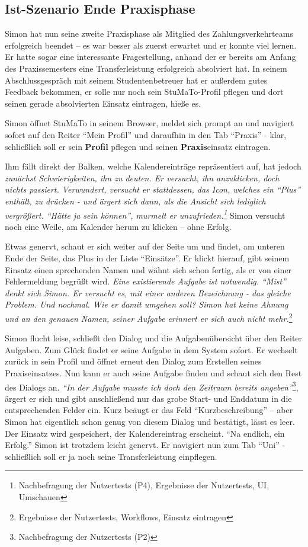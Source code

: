 \documentclass[
  12pt,
  ngerman,
  a4paper,
]{article}
\begin{document}
\hypertarget{ist-szenario-ende-praxisphase}{%
\subsection{Ist-Szenario Ende
Praxisphase}\label{ist-szenario-ende-praxisphase}}

Simon hat nun seine zweite Praxisphase als Mitglied des
Zahlungsverkehrteams erfolgreich beendet -- es war besser als zuerst
erwartet und er konnte viel lernen. Er hatte sogar eine interessante
Fragestellung, anhand der er bereits am Anfang des Praxissemesters eine
Transferleistung erfolgreich absolviert hat. In seinem Abschlussgespräch
mit seinem Studentenbetreuer hat er außerdem gutes Feedback bekommen, er
solle nur noch sein StuMaTo-Profil pflegen und dort seinen gerade
absolvierten Einsatz eintragen, hieße es.

Simon öffnet StuMaTo in seinem Browser, meldet sich prompt an und
navigiert sofort auf den Reiter ``Mein Profil'' und daraufhin in den Tab
``Praxis'' - klar, schließlich soll er sein \textbf{Profil} pflegen und
seinen \textbf{Praxis}einsatz eintragen.

Ihm fällt direkt der Balken, welche Kalendereinträge repräsentiert auf,
hat jedoch \emph{zunächst Schwierigkeiten, ihn zu deuten. Er versucht,
ihn anzuklicken, doch nichts passiert. Verwundert, versucht er
stattdessen, das Icon, welches ein ``Plus'' enthält, zu drücken - und
ärgert sich dann, als die Ansicht sich lediglich vergrößert. ``Hätte ja
sein können'', murmelt er unzufrieden.\footnote{Nachbefragung der
  Nutzertests (P4), Ergebnisse der Nutzertests, UI, Umschauen}} Simon
versucht noch eine Weile, am Kalender herum zu klicken -- ohne Erfolg.

Etwas genervt, schaut er sich weiter auf der Seite um und findet, am
unteren Ende der Seite, das Plus in der Liste ``Einsätze''. Er klickt
hierauf, gibt seinem Einsatz einen sprechenden Namen und wähnt sich
schon fertig, als er von einer Fehlermeldung begrüßt wird. \emph{Eine
existierende Aufgabe ist notwendig. ``Mist'' denkt sich Simon. Er
versucht es, mit einer anderen Bezeichnung - das gleiche Problem. Und
nochmal. Wie er damit umgehen soll? Simon hat keine Ahnung und an den
genauen Namen, seiner Aufgabe erinnert er sich auch nicht
mehr.}\footnote{Ergebnisse der Nutzertests, Workflows, Einsatz eintragen}

Simon flucht leise, schließt den Dialog und die Aufgabenübersicht über
den Reiter Aufgaben. Zum Glück findet er seine Aufgabe in dem System
sofort. Er wechselt zurück in sein Profil und öffnet erneut den Dialog
zum Erstellen seines Praxiseinsatzes. Nun kann er auch seine Aufgabe
finden und schaut sich den Rest des Dialogs an. \emph{``In der Aufgabe
musste ich doch den Zeitraum bereits angeben''}\footnote{Nachbefragung
  der Nutzertests (P2)}, ärgert er sich und gibt anschließend nur das
grobe Start- und Enddatum in die entsprechenden Felder ein. Kurz beäugt
er das Feld ``Kurzbeschreibung'' -- aber Simon hat eigentlich schon
genug von diesem Dialog und bestätigt, lässt es leer. Der Einsatz wird
gespeichert, der Kalendereintrag erscheint. ``Na endlich, ein Erfolg.''
Simon ist trotzdem leicht genervt. Er navigiert nun zum Tab ``Uni'' -
schließlich soll er ja noch seine Transferleistung einpflegen.
\end{document}
